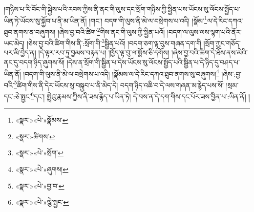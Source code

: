 །གཉིས་པ་རི་བོང་གི་སྐྱེས་པའི་རབས་ཀྱིས་ནི་ནང་གི་ལུས་དང་སྲོག་གཉིས་ཀྱི་སྦྱིན་པས་ཡོངས་སུ་ལོངས་སྤྱོད་པ་ཡིན་ཏེ་ཡོངས་སུ་སྐྱོབ་པ་ནི་མ་ཡིན་ནོ། །གང་། བདག་གི་ལུས་ནི་མེ་ལ་བསྲེགས་པ་འདི། །སྣོམ་\footnote{«སྣར་»«པེ་»སྣོམས་}ལ་དེ་རིང་དཀའ་ཐུབ་ནགས་ན་བཞུགས། །ཞེས་བྱ་བའི་ཚིག་\footnote{«སྣར་»ཚིགས་}གིས་ནང་གི་ལུས་ཀྱི་སྦྱིན་པའོ། །བདག་ལ་ལུས་ལས་ལྷག་པའི་ནོར་ཡང་མེད། །ཅེས་བྱ་བའི་ཚིག་གིས་ནི་:སྲོག་གི་\footnote{«སྣར་»«པེ་»སྲོག་}སྦྱིན་པའོ། །བདག་ཅག་ལྟ་བུས་གཞན་དག་གི །སྲོག་ཀྱང་གཅོད་པར་མི་བྱེད་ན། །དེ་ལྟར་རབ་ཏུ་བྱམས་བརྟན་པ། །ཁྱོད་ལྟ་བུ་ལ་སྨོས་ཅི་དགོས། །ཞེས་བྱ་བའི་ཚིག་དེ་ཐོས་ནས་མེའི་ནང་དུ་བདག་ཉིད་ཞུགས་སོ། །དེས་ན་སྲོག་གི་སྦྱིན་པ་དེས་ཡོངས་སུ་ལོངས་སྤྱོད་པའི་སྦྱིན་པ་དེ་ཉིད་དུ་བཤད་པ་ཡིན་ནོ། །བདག་གི་ལུས་ནི་མེ་ལ་བསྲེགས་པ་འདི། །སྣོམས་ལ་དེ་རིང་དཀའ་ཐུབ་ནགས་སུ་བཞུགས།\footnote{«སྣར་»«པེ་»ཞུགས།} །ཞེས་:བྱ་བའི་\footnote{«སྣར་»«པེ་»བྱ་བ་}ཚིག་གིས་ནི་དེར་ཡོངས་སུ་བསྐྱབ་པ་ནི་མེད་དེ། བདག་ཉིད་འཆི་བ་དེ་ལས་གཞན་མ་རྙེད་པས་སོ། །སྲམ་དང་:ཅེ་སྤྱང་\footnote{«སྣར་»«པེ་»ལྕེ་སྤྱང་}དང་། སྤྲེའུ་རྣམས་ཀྱིས་ནི་ཟས་རྙེད་པ་ཡིན་ཏེ། དེ་བས་ན་དེ་དག་གིས་དང་པོར་ཟས་བྱིན་པ་:ཡིན་ནོ། །
